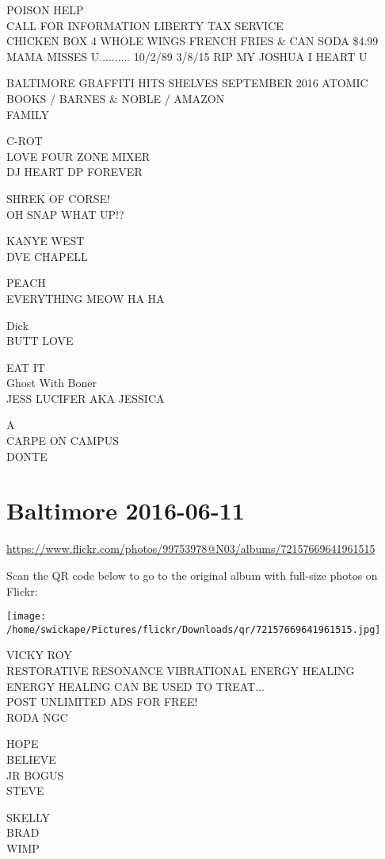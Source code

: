 \documentclass[10pt,letterpaper]{article}
\begin{document}
POISON HELP\\
CALL FOR INFORMATION LIBERTY TAX SERVICE\\
CHICKEN BOX 4 WHOLE WINGS FRENCH FRIES \& CAN SODA \$4.99\\
MAMA MISSES U.......... 10/2/89 3/8/15 RIP MY JOSHUA I HEART U

BALTIMORE GRAFFITI HITS SHELVES SEPTEMBER 2016 ATOMIC BOOKS / BARNES \& NOBLE / AMAZON\\
FAMILY

C{-}ROT\\
LOVE FOUR ZONE MIXER\\
DJ HEART DP FOREVER

SHREK OF CORSE!\\
OH SNAP WHAT UP!?

KANYE WEST\\
DVE CHAPELL

PEACH\\
EVERYTHING MEOW HA HA

Dick\\
BUTT LOVE

EAT IT\\
Ghost With Boner\\
JESS LUCIFER AKA JESSICA

A\\
CARPE ON CAMPUS\\
DONTE
\pagebreak

\section*{Baltimore 2016-06-11}

\url{https://www.flickr.com/photos/99753978@N03/albums/72157669641961515}

Scan the QR code below to go to the original album with full-size photos on Flickr:

\texttt{[image: /home/swickape/Pictures/flickr/Downloads/qr/72157669641961515.jpg]}
\pagebreak

VICKY ROY\\
RESTORATIVE RESONANCE VIBRATIONAL ENERGY HEALING ENERGY HEALING CAN BE USED TO TREAT...\\
POST UNLIMITED ADS FOR FREE!\\
RODA NGC

HOPE\\
BELIEVE\\
JR BOGUS\\
STEVE

SKELLY\\
BRAD\\
WIMP
\end{document}
